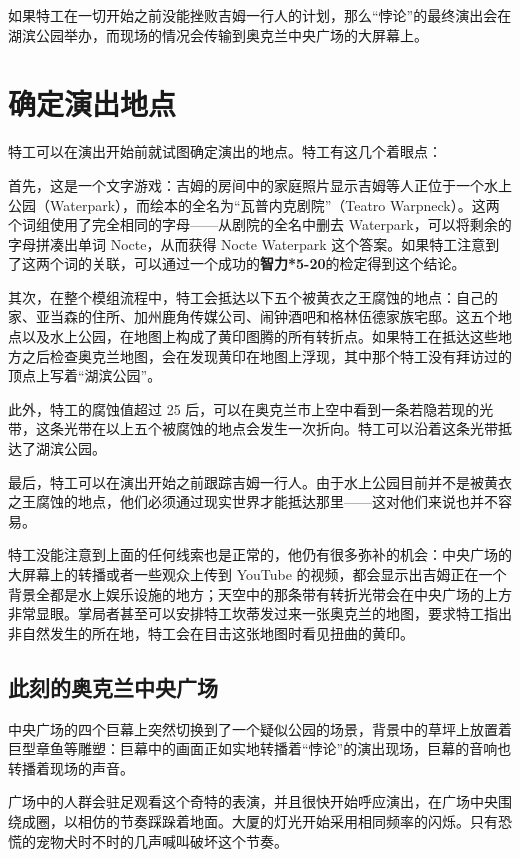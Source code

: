 如果特工在一切开始之前没能挫败吉姆一行人的计划，那么“悖论”的最终演出会在湖滨公园举办，而现场的情况会传输到奥克兰中央广场的大屏幕上。

\section{确定演出地点}

特工可以在演出开始前就试图确定演出的地点。特工有这几个着眼点：

首先，这是一个文字游戏：吉姆的房间中的家庭照片显示吉姆等人正位于一个水上公园（Waterpark），而绘本的全名为“瓦普内克剧院”（Teatro Warpneck）。这两个词组使用了完全相同的字母——从剧院的全名中删去 Waterpark，可以将剩余的字母拼凑出单词 Nocte，从而获得 Nocte Waterpark 这个答案。如果特工注意到了这两个词的关联，可以通过一个成功的\textbf{智力*5-20}的检定得到这个结论。

其次，在整个模组流程中，特工会抵达以下五个被黄衣之王腐蚀的地点：自己的家、亚当森的住所、加州鹿角传媒公司、闹钟酒吧和格林伍德家族宅邸。这五个地点以及水上公园，在地图上构成了黄印图腾的所有转折点。如果特工在抵达这些地方之后检查奥克兰地图，会在发现黄印在地图上浮现，其中那个特工没有拜访过的顶点上写着“湖滨公园”。

此外，特工的腐蚀值超过 25 后，可以在奥克兰市上空中看到一条若隐若现的光带，这条光带在以上五个被腐蚀的地点会发生一次折向。特工可以沿着这条光带抵达了湖滨公园。

最后，特工可以在演出开始之前跟踪吉姆一行人。由于水上公园目前并不是被黄衣之王腐蚀的地点，他们必须通过现实世界才能抵达那里——这对他们来说也并不容易。

特工没能注意到上面的任何线索也是正常的，他仍有很多弥补的机会：中央广场的大屏幕上的转播或者一些观众上传到 YouTube 的视频，都会显示出吉姆正在一个背景全都是水上娱乐设施的地方；天空中的那条带有转折光带会在中央广场的上方非常显眼。掌局者甚至可以安排特工坎蒂发过来一张奥克兰的地图，要求特工指出非自然发生的所在地，特工会在目击这张地图时看见扭曲的黄印。

\subsection{此刻的奥克兰中央广场}

中央广场的四个巨幕上突然切换到了一个疑似公园的场景，背景中的草坪上放置着巨型章鱼等雕塑：巨幕中的画面正如实地转播着“悖论”的演出现场，巨幕的音响也转播着现场的声音。

广场中的人群会驻足观看这个奇特的表演，并且很快开始呼应演出，在广场中央围绕成圈，以相仿的节奏踩跺着地面。大厦的灯光开始采用相同频率的闪烁。只有恐慌的宠物犬时不时的几声喊叫破坏这个节奏。


